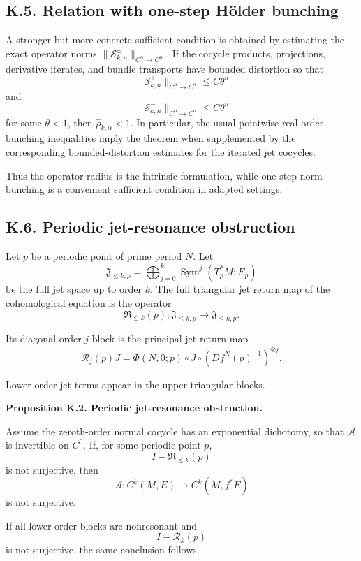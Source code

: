 \documentclass[12pt,a4paper]{article}
\theoremstyle{plain}
\numberwithin{equation}{section}
\numberwithin{theorem}{section}
\begin{document}
\subsection{K.5. Relation with one-step H\"older bunching}

A stronger but more concrete sufficient condition is obtained by estimating the exact operator norms $\|\mathcal S_{k,n}^\pm\|_{C^\alpha\to C^\alpha}$. If the cocycle products, projections, derivative iterates, and bundle transports have bounded distortion so that
\[
\|\mathcal S_{k,n}^+\|_{C^\alpha\to C^\alpha}
\le
C\theta^n
\]
and
\[
\|\mathcal S_{k,n}^-\|_{C^\alpha\to C^\alpha}
\le
C\theta^n
\]
for some $\theta<1$, then $\widehat\rho_{k,\alpha}<1$. In particular, the usual pointwise real-order bunching inequalities imply the theorem when supplemented by the corresponding bounded-distortion estimates for the iterated jet cocycles.

Thus the operator radius is the intrinsic formulation, while one-step norm-bunching is a convenient sufficient condition in adapted settings.

\subsection{K.6. Periodic jet-resonance obstruction}

Let $p$ be a periodic point of prime period $N$. Let
\[
\mathfrak J_{\le k,p}
=
\bigoplus_{j=0}^{k}
\operatorname{Sym}^j(T_p^*M;E_p)
\]
be the full jet space up to order $k$. The full triangular jet return map of the cohomological equation is the operator
\[
\mathfrak R_{\le k}(p):
\mathfrak J_{\le k,p}
\to
\mathfrak J_{\le k,p}.
\]

Its diagonal order-$j$ block is the principal jet return map
\[
\mathscr R_j(p)J
=
\Phi(N,0;p)
\circ J\circ
(Df^N(p)^{-1})^{\otimes j}.
\]

Lower-order jet terms appear in the upper triangular blocks.

\textbf{Proposition K.2. Periodic jet-resonance obstruction.}

Assume the zeroth-order normal cocycle has an exponential dichotomy, so that $\mathcal A$ is invertible on $C^0$. If, for some periodic point $p$,
\[
I-
\mathfrak R_{\le k}(p)
\]
is not surjective, then
\[
\mathcal A:C^k(M,E)\to C^k(M,f^*E)
\]
is not surjective.

If all lower-order blocks are nonresonant and
\[
I-
\mathscr R_k(p)
\]
is not surjective, the same conclusion follows.
\end{document}
